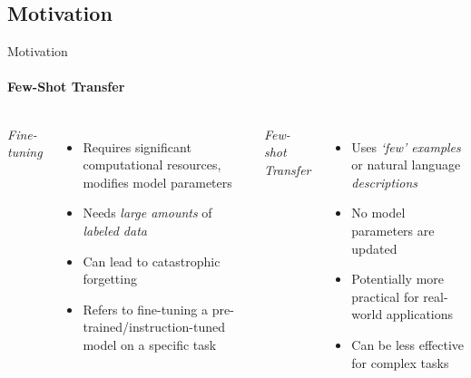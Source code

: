 \documentclass[aspectratio=169]{beamer}
\begin{document}
\subsection{Motivation}
\begin{frame}{Motivation}
  \framesubtitle{Few-Shot Transfer}
  \begin{columns}[T]
      \centering \emph{Fine-tuning}
      \begin{itemize}
        \item Requires significant computational resources, modifies model parameters
        \item Needs \emph{large amounts} of \emph{labeled data}
        \item Can lead to catastrophic forgetting
        \item Refers to fine-tuning a pre-trained/instruction-tuned model on a specific task
      \end{itemize}
    \centering \emph{Few-shot Transfer}
    \begin{itemize}
        \item Uses \emph{`few' examples} or natural language \emph{descriptions}
        \item No model parameters are updated
        \item Potentially more practical for real-world applications~
        \item Can be less effective for complex tasks
    \end{itemize}
  \end{columns}
\end{frame}
\end{document}
